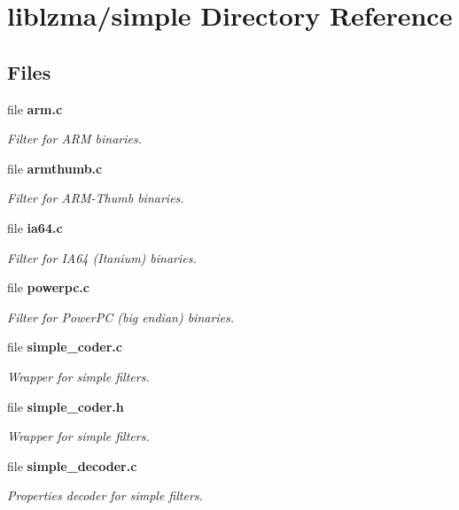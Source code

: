 \section{liblzma/simple Directory Reference}
\label{dir_458323780241bdde152c345212bdceaa}
\subsection*{Files}
\begin{DoxyCompactItemize}
\item 
file \textbf{ arm.\+c}
\begin{DoxyCompactList}\small\item\em Filter for A\+RM binaries. \end{DoxyCompactList}\item 
file \textbf{ armthumb.\+c}
\begin{DoxyCompactList}\small\item\em Filter for A\+R\+M-\/\+Thumb binaries. \end{DoxyCompactList}\item 
file \textbf{ ia64.\+c}
\begin{DoxyCompactList}\small\item\em Filter for I\+A64 (Itanium) binaries. \end{DoxyCompactList}\item 
file \textbf{ powerpc.\+c}
\begin{DoxyCompactList}\small\item\em Filter for Power\+PC (big endian) binaries. \end{DoxyCompactList}\item 
file \textbf{ simple\+\_\+coder.\+c}
\begin{DoxyCompactList}\small\item\em Wrapper for simple filters. \end{DoxyCompactList}\item 
file \textbf{ simple\+\_\+coder.\+h}
\begin{DoxyCompactList}\small\item\em Wrapper for simple filters. \end{DoxyCompactList}\item 
file \textbf{ simple\+\_\+decoder.\+c}
\begin{DoxyCompactList}\small\item\em Properties decoder for simple filters. \end{DoxyCompactList}\item 

\end{DoxyCompactItemize}
